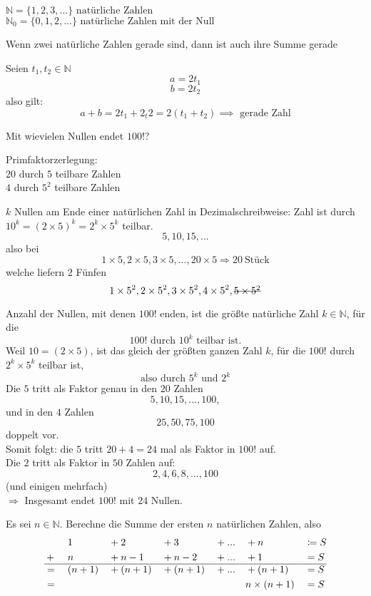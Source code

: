 \documentclass[a4paper, parskip = true, fleqn, headsepline = true]{scrartcl}
\begin{document}
$\mathbb{N} = \{1, 2, 3, ...\} \text{ natürliche Zahlen}$\\
$\mathbb{N}_0 = \{0, 1, 2, ...\} \text{ natürliche Zahlen mit der Null}$\par

\begin{problem}
	\begin{conjecture}
		Wenn zwei natürliche Zahlen gerade sind, dann ist auch ihre Summe gerade
	\end{conjecture}
	Seien $t_1, t_2 \in \mathbb{N}$
	\[ a = 2t_1 \]
	\[ b = 2t_2 \]
	also gilt:
	\[ a + b = 2t_1 + 2_t2 = 2(t_1+t_2) \implies \text{ gerade Zahl}\]
\end{problem}

\begin{problem}
	Mit wievielen Nullen endet $100!$?\par
	Primfaktorzerlegung:\\
	$20$ durch $5$ teilbare Zahlen\\
	$4$ durch $5^2$ teilbare Zahlen\par
	$k$ Nullen am Ende einer natürlichen Zahl in Dezimalschreibweise: Zahl ist durch $10^k = \left( 2 \times 5 \right)^k = 2^k  \times 5^k$ teilbar.
	\[5, 10, 15, ...\]
	also bei
	\[1 \times 5, 2 \times 5, 3 \times 5, ..., 20 \times 5 \Rightarrow \qty{20}{\text{Stück}}\]
	welche liefern $2$ Fünfen
	\[1 \times 5^2, 2 \times 5^2, 3 \times 5^2, 4 \times 5^2, \text{\hbox{\sout{$5 \times 5^2$}}}\]\par
	Anzahl der Nullen, mit denen $100!$ enden, ist die größte natürliche Zahl $k \in \mathbb{N}$, für die
	\[100! \text{ durch } 10^k \text{ teilbar ist.}\]
	Weil $10 = (2 \times 5)$, ist das gleich der größten ganzen Zahl $k$, für die $100!$ durch $2^k \times 5^k$ teilbar ist,
	\[\text{also durch } 5^k \text{ und } 2^k\]
	Die $5$ tritt als Faktor genau in den $20$ Zahlen
	\[5, 10, 15, ..., 100,\]
	und in den $4$ Zahlen
	\[25, 50, 75, 100\]
	doppelt vor.\\
	Somit folgt: die $5$ tritt $20 + 4 = 24$ mal als Faktor in $100!$ auf.\\
	Die $2$ tritt als Faktor in $50$ Zahlen auf:
	\[2, 4, 6, 8, ..., 100\]
	(und einigen mehrfach)\\
	$\Rightarrow$ Insgesamt endet $100!$ mit $24$ Nullen.
\end{problem}

\begin{problem}
	Es sei $n \in \mathbb{N}$. Berechne die Summe der ersten $n$ natürlichen Zahlen, also
	\begin{alignat*}{7}
		&~{}	&&1		&&+ 2		&&+ 3		&&+ ... &&+ n			&&\coloneqq S\\
		&+{} 	&&n		&&+ n - 1	&&+ n - 2	&&+ ... &&+ 1			&&= S\\
		\hline
		&={} 	&&(n+1)		&&+(n+1)	&&+(n+1)	&&+ ... &&+(n+1)		&&= S\\
		&={} 	&&~		&&~		&&~		&&~	&&n\times (n + 1)	&&= S
	\end{alignat*}
\end{problem}
\end{document}
